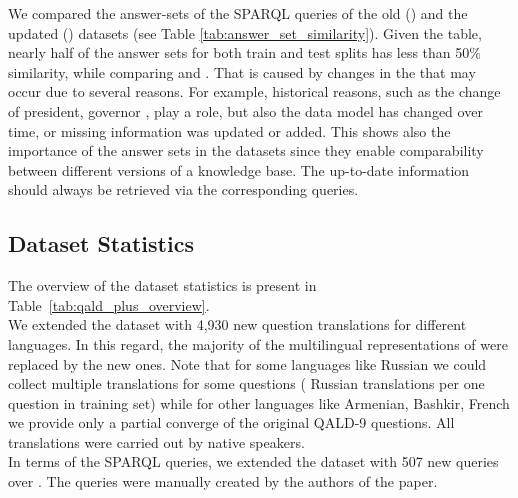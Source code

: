 \documentclass[conference]{IEEEtran}
\begin{document}
\begin{comment}
\begin{table*}[t]
    \caption{Number of \QALD-9 questions improved in the \QALDplus dataset}
    \label{tab:qald_plus_changes}
    \centering
    \begin{tabular}{c|c|c|c}
         &  \textbf{de} & \textbf{ru} & \textbf{fr} \\\hline
         \textbf{number of question in train and test in \QALD-9} & & & \\\hline
         \textbf{number of changed question in train and test in \QALDplus} & & & \\\hline
    \end{tabular}
\end{table*}
\end{comment}

We compared the answer-sets of the SPARQL queries of the old () and the updated (\QALDplus) datasets (see Table \ref{tab:answer_set_similarity}). Given the table, nearly half of the  answer sets for both train and test splits has less than 50\% similarity, while comparing  and \QALDplus.
That is caused by changes in the \DBpedia that may occur due to several reasons.
For example, historical reasons, such as the change of president, governor \etc, play a role, but also the data model has changed over time, or missing information was updated or added.
This shows also the importance of the answer sets in the \KGQA datasets since they enable comparability between different versions of a knowledge base.
The up-to-date information should always be retrieved via the corresponding \SPARQL queries.

\subsection{Dataset Statistics}









The overview of the dataset statistics is present in Table~\ref{tab:qald_plus_overview}.\\
We extended the dataset with 4,930 new question translations for different languages. 
In this regard, the majority of the multilingual representations of  were replaced by the new ones.
Note that for some languages like Russian we could collect multiple translations for some questions ( Russian translations per one question in training set) while for other languages like Armenian, Bashkir, French we provide only a partial converge of the original QALD-9 questions. 
All translations were carried out by native speakers.\\
In terms of the SPARQL queries, we extended the dataset with 507 new queries over \Wikidata. 
The queries were manually created by the authors of the paper. 
\end{document}
